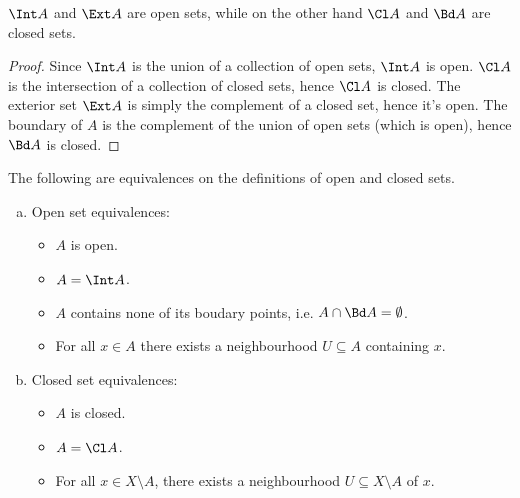 \begin{proposition}\label{prop:open-close-int-ext-closure-boundary}
\(\Int A\) and \(\Ext A\) are open sets, while on the other hand \(\Cl A\)
and \(\Bd A\) are closed sets.
\end{proposition}

\begin{proof}
Since \(\Int A\) is the union of a collection of open sets, \(\Int A\) is
open. \(\Cl A\) is the intersection of a collection of closed sets, hence
\(\Cl A\) is closed. The exterior set \(\Ext A\) is simply the complement
of a closed set, hence it's open. The boundary of \(A\) is the complement of the
union of open sets (which is open), hence \(\Bd A\) is closed.
\end{proof}

\begin{proposition}
\label{prop:equiv-open-and-closed-set}
The following are equivalences on the definitions of open and closed sets.
\begin{enumerate}[(a)]\setlength\itemsep{0em}
\item Open set equivalences:
  \begin{itemize}\setlength\itemsep{0em}
    \item \(A\) is open.

    \item \(A = \Int A\).

    \item \(A\) contains none of its boudary points, i.e. \(A \cap \Bd A =
      \emptyset\).

    \item For all \(x \in A\) there exists a neighbourhood \(U \subseteq A\)
      containing \(x\).
  \end{itemize}

\item Closed set equivalences:
  \begin{itemize}\setlength\itemsep{0em}
    \item \(A\) is closed.

    \item \(A = \Cl A\).

    \item For all \(x \in X \setminus A\), there exists a neighbourhood \(U
      \subseteq X \setminus A\) of \(x\).
  \end{itemize}
\end{enumerate}
\end{proposition}

